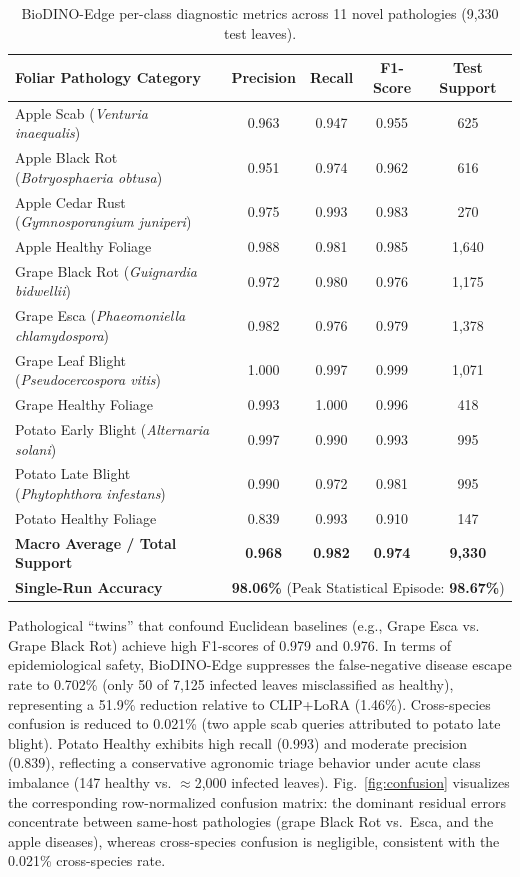 \documentclass[preprint,12pt]{elsarticle}
\begin{document}
\begin{table}[htbp]
\centering
\caption{BioDINO-Edge per-class diagnostic metrics across 11 novel pathologies (9,330 test leaves).}
\label{tab:per_class}
\small
\begin{tabularx}{\textwidth}{lcccc}
\toprule
\textbf{Foliar Pathology Category} & \textbf{Precision} & \textbf{Recall} & \textbf{F1-Score} & \textbf{Test Support} \\
\midrule
Apple Scab (\textit{Venturia inaequalis}) & 0.963 & 0.947 & 0.955 & 625 \\
Apple Black Rot (\textit{Botryosphaeria obtusa}) & 0.951 & 0.974 & 0.962 & 616 \\
Apple Cedar Rust (\textit{Gymnosporangium juniperi}) & 0.975 & 0.993 & 0.983 & 270 \\
Apple Healthy Foliage & 0.988 & 0.981 & 0.985 & 1,640 \\
\midrule
Grape Black Rot (\textit{Guignardia bidwellii}) & 0.972 & 0.980 & 0.976 & 1,175 \\
Grape Esca (\textit{Phaeomoniella chlamydospora}) & 0.982 & 0.976 & 0.979 & 1,378 \\
Grape Leaf Blight (\textit{Pseudocercospora vitis}) & 1.000 & 0.997 & 0.999 & 1,071 \\
Grape Healthy Foliage & 0.993 & 1.000 & 0.996 & 418 \\
\midrule
Potato Early Blight (\textit{Alternaria solani}) & 0.997 & 0.990 & 0.993 & 995 \\
Potato Late Blight (\textit{Phytophthora infestans}) & 0.990 & 0.972 & 0.981 & 995 \\
Potato Healthy Foliage & 0.839 & 0.993 & 0.910 & 147 \\
\midrule
\textbf{Macro Average / Total Support} & \textbf{0.968} & \textbf{0.982} & \textbf{0.974} & \textbf{9,330} \\
\textbf{Single-Run Accuracy} & \multicolumn{4}{c}{\textbf{98.06\%} (Peak Statistical Episode: \textbf{98.67\%})} \\
\bottomrule
\end{tabularx}
\end{table}

Pathological ``twins'' that confound Euclidean baselines (e.g., Grape Esca vs. Grape Black Rot) achieve high F1-scores of 0.979 and 0.976. In terms of epidemiological safety, BioDINO-Edge suppresses the false-negative disease escape rate to 0.702\% (only 50 of 7,125 infected leaves misclassified as healthy), representing a 51.9\% reduction relative to CLIP+LoRA (1.46\%). Cross-species confusion is reduced to 0.021\% (two apple scab queries attributed to potato late blight). Potato Healthy exhibits high recall (0.993) and moderate precision (0.839), reflecting a conservative agronomic triage behavior under acute class imbalance (147 healthy vs. $\approx$2,000 infected leaves). Fig.~\ref{fig:confusion} visualizes the corresponding row-normalized confusion matrix: the dominant residual errors concentrate between same-host pathologies (grape Black Rot vs.\ Esca, and the apple diseases), whereas cross-species confusion is negligible, consistent with the 0.021\% cross-species rate.
\end{document}

